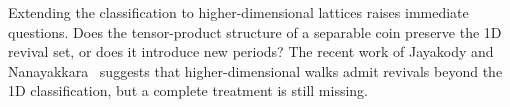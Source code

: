 Extending the classification to higher-dimensional lattices raises
immediate questions. Does the tensor-product structure of a separable
coin preserve the 1D revival set, or does it introduce new periods?
The recent work of Jayakody and Nanayakkara~\cite{Jayakody2018}
suggests that higher-dimensional walks admit revivals beyond the
1D classification, but a complete treatment is still missing.
